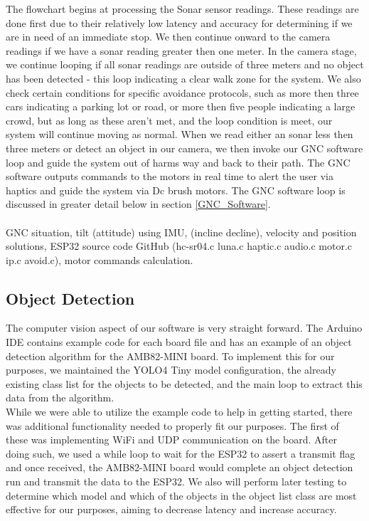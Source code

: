 \noindent The flowchart begins at processing the Sonar sensor readings. These readings are done first due to their relatively low latency and accuracy for determining if we are in need of an immediate stop. We then continue onward to the camera readings if we have a sonar reading greater then one meter. In the camera stage, we continue looping if all sonar readings are outside of three meters and no object has been detected - this loop indicating a clear walk zone for the system. We also check certain conditions for specific avoidance protocols, such as more then three cars indicating a parking lot or road, or more then five people indicating a large crowd, but as long as these aren't met, and the loop condition is meet, our system will continue moving as normal. When we read either an sonar less then three meters or detect an object in our camera, we then invoke our GNC software loop and guide the system out of harms way and back to their path. The GNC software outputs commands to the motors in real time to alert the user via haptics and guide the system via Dc brush motors. The GNC software loop is discussed in greater detail below in section \ref{GNC_Software}. \\


 \\
\noindent GNC situation, tilt (attitude) using IMU, (incline decline), velocity and position solutions, ESP32 source code GitHub (hc-sr04.c luna.c haptic.c audio.c motor.c ip.c avoid.c), motor commands calculation. \\

\subsection{Object Detection}
\noindent The computer vision aspect of our software is very straight forward. The Arduino IDE contains example code for each board file and has an example of an object detection algorithm for the AMB82-MINI board. To implement this for our purposes, we maintained the YOLO4 Tiny model configuration, the already existing class list for the objects to be detected, and the main loop to extract this data from the algorithm. \\

\noindent While we were able to utilize the example code to help in getting started, there was additional functionality needed to properly fit our purposes. The first of these was implementing WiFi and UDP communication on the board. After doing such, we used a while loop to wait for the ESP32 to assert a transmit flag and once received, the AMB82-MINI board would complete an object detection run and transmit the data to the ESP32. We also will perform later testing to determine which model and which of the objects in the object list class are most effective for our purposes, aiming to decrease latency and increase accuracy. \\

